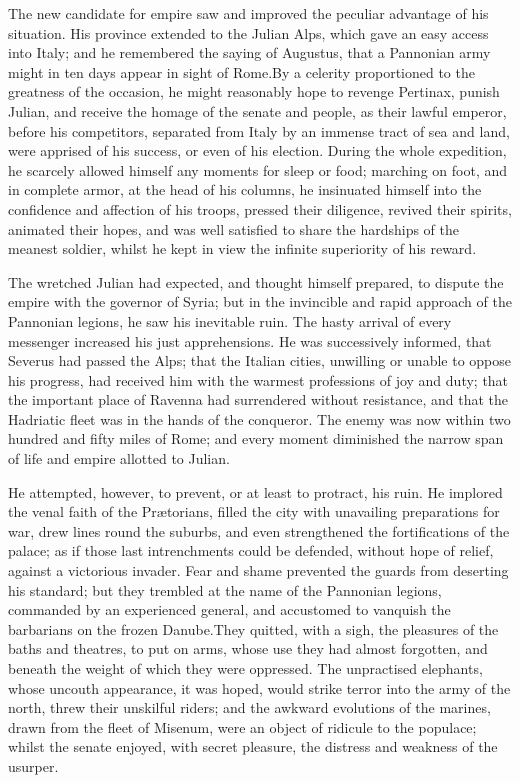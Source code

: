 The new candidate for empire saw and improved the peculiar
advantage of his situation. His province extended to the Julian
Alps, which gave an easy access into Italy; and he remembered the
saying of Augustus, that a Pannonian army might in ten days
appear in sight of Rome.\footnotemark[31] By a celerity proportioned to the
greatness of the occasion, he might reasonably hope to revenge
Pertinax, punish Julian, and receive the homage of the senate and
people, as their lawful emperor, before his competitors,
separated from Italy by an immense tract of sea and land, were
apprised of his success, or even of his election. During the
whole expedition, he scarcely allowed himself any moments for
sleep or food; marching on foot, and in complete armor, at the
head of his columns, he insinuated himself into the confidence
and affection of his troops, pressed their diligence, revived
their spirits, animated their hopes, and was well satisfied to
share the hardships of the meanest soldier, whilst he kept in
view the infinite superiority of his reward.


The wretched Julian had expected, and thought himself prepared,
to dispute the empire with the governor of Syria; but in the
invincible and rapid approach of the Pannonian legions, he saw
his inevitable ruin. The hasty arrival of every messenger
increased his just apprehensions. He was successively informed,
that Severus had passed the Alps; that the Italian cities,
unwilling or unable to oppose his progress, had received him with
the warmest professions of joy and duty; that the important place
of Ravenna had surrendered without resistance, and that the
Hadriatic fleet was in the hands of the conqueror. The enemy was
now within two hundred and fifty miles of Rome; and every moment
diminished the narrow span of life and empire allotted to Julian.

He attempted, however, to prevent, or at least to protract, his
ruin. He implored the venal faith of the Prætorians, filled the
city with unavailing preparations for war, drew lines round the
suburbs, and even strengthened the fortifications of the palace;
as if those last intrenchments could be defended, without hope of
relief, against a victorious invader. Fear and shame prevented
the guards from deserting his standard; but they trembled at the
name of the Pannonian legions, commanded by an experienced
general, and accustomed to vanquish the barbarians on the frozen
Danube.\footnotemark[32] They quitted, with a sigh, the pleasures of the baths
and theatres, to put on arms, whose use they had almost
forgotten, and beneath the weight of which they were oppressed.
The unpractised elephants, whose uncouth appearance, it was
hoped, would strike terror into the army of the north, threw
their unskilful riders; and the awkward evolutions of the
marines, drawn from the fleet of Misenum, were an object of
ridicule to the populace; whilst the senate enjoyed, with secret
pleasure, the distress and weakness of the usurper.\footnotemark[33]


